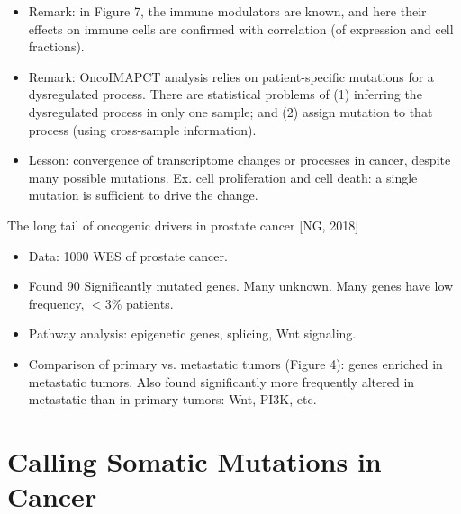 \documentclass{report}
\begin{document}
\begin{itemize}
	\item Remark: in Figure 7, the immune modulators are known, and here their effects on immune cells are confirmed with correlation (of expression and cell fractions).  
	
	\item Remark: OncoIMAPCT analysis relies on patient-specific mutations for a dysregulated process. There are statistical problems of (1) inferring the dysregulated process in only one sample; and (2) assign mutation to that process (using cross-sample information).  
	
	\item Lesson: convergence of transcriptome changes or processes in cancer, despite many possible mutations. Ex. cell proliferation and cell death: a single mutation is sufficient to drive the change. 
\end{itemize}

The long tail of oncogenic drivers in prostate cancer [NG, 2018]
\begin{itemize}
	
	\item Data: 1000 WES of prostate cancer. 
	
	\item Found 90 Significantly mutated genes. Many unknown. Many genes have low frequency, $<3\%$ patients. 
	
	\item Pathway analysis: epigenetic genes, splicing, Wnt signaling. 
	
	\item Comparison of primary vs. metastatic tumors (Figure 4): genes enriched in metastatic tumors. Also found significantly more frequently altered in metastatic than in primary tumors: Wnt, PI3K, etc. 
\end{itemize}
\section{Calling Somatic Mutations in Cancer}
\end{document}
